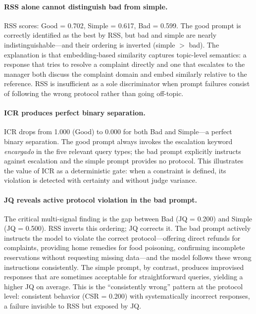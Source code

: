 \documentclass[11pt,a4paper]{article}
\begin{document}
\paragraph{RSS alone cannot distinguish bad from simple.}
RSS scores: Good = 0.702, Simple = 0.617, Bad = 0.599. The good prompt is correctly identified as the best by RSS, but bad and simple are nearly indistinguishable---and their ordering is inverted (simple $>$ bad). The explanation is that embedding-based similarity captures topic-level semantics: a response that tries to resolve a complaint directly and one that escalates to the manager both discuss the complaint domain and embed similarly relative to the reference. RSS is insufficient as a sole discriminator when prompt failures consist of following the wrong protocol rather than going off-topic.

\paragraph{ICR produces perfect binary separation.}
ICR drops from 1.000 (Good) to 0.000 for both Bad and Simple---a perfect binary separation. The good prompt always invokes the escalation keyword \textit{encargado} in the five relevant query types; the bad prompt explicitly instructs against escalation and the simple prompt provides no protocol. This illustrates the value of ICR as a deterministic gate: when a constraint is defined, its violation is detected with certainty and without judge variance.

\paragraph{JQ reveals active protocol violation in the bad prompt.}
The critical multi-signal finding is the gap between Bad (JQ = 0.200) and Simple (JQ = 0.500). RSS inverts this ordering; JQ corrects it. The bad prompt actively instructs the model to violate the correct protocol---offering direct refunds for complaints, providing home remedies for food poisoning, confirming incomplete reservations without requesting missing data---and the model follows these wrong instructions consistently. The simple prompt, by contrast, produces improvised responses that are sometimes acceptable for straightforward queries, yielding a higher JQ on average. This is the ``consistently wrong'' pattern at the protocol level: consistent behavior (CSR = 0.200) with systematically incorrect responses, a failure invisible to RSS but exposed by JQ.
\end{document}

